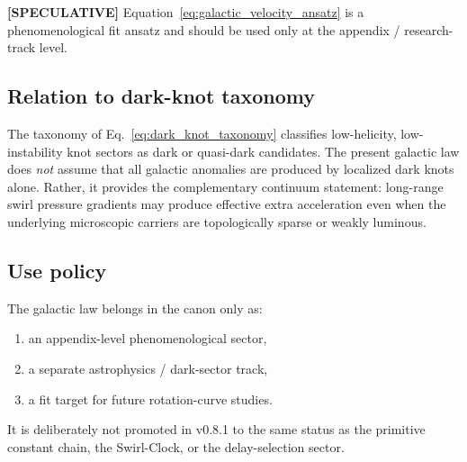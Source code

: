 \documentclass[11pt]{article}
\theoremstyle{definition}
\theoremstyle{plain}
\theoremstyle{remark}
\begin{document}
        \textbf{[SPECULATIVE]} Equation~\eqref{eq:galactic_velocity_ansatz} is a phenomenological fit ansatz and should be used only at the appendix / research-track level.
    
    \subsection{Relation to dark-knot taxonomy}
        The taxonomy of Eq.~\eqref{eq:dark_knot_taxonomy} classifies low-helicity, low-instability knot sectors as dark or quasi-dark candidates. The present galactic law does \emph{not} assume that all galactic anomalies are produced by localized dark knots alone. Rather, it provides the complementary continuum statement: long-range swirl pressure gradients may produce effective extra acceleration even when the underlying microscopic carriers are topologically sparse or weakly luminous.
    
    \subsection{Use policy}
        The galactic law belongs in the canon only as:
        \begin{enumerate}
            \item an appendix-level phenomenological sector,
            \item a separate astrophysics / dark-sector track,
            \item a fit target for future rotation-curve studies.
        \end{enumerate}
        It is deliberately not promoted in v0.8.1 to the same status as the primitive constant chain, the Swirl-Clock, or the delay-selection sector.
        
        \newpage
        
        
\end{document}
